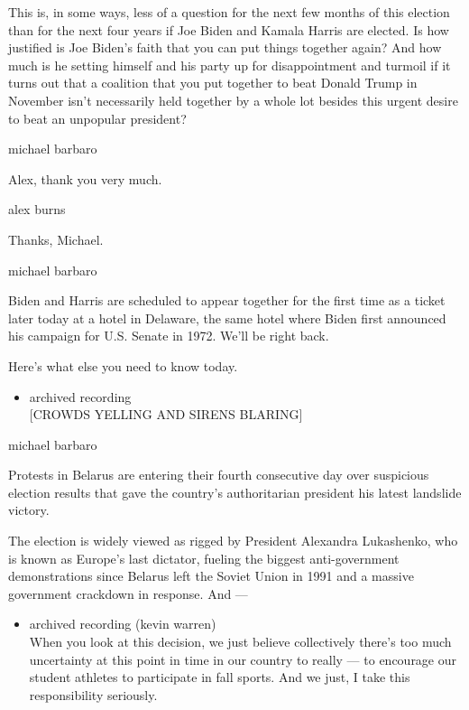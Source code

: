 This is, in some ways, less of a question for the next few months of
this election than for the next four years if Joe Biden and Kamala
Harris are elected. Is how justified is Joe Biden's faith that you can
put things together again? And how much is he setting himself and his
party up for disappointment and turmoil if it turns out that a coalition
that you put together to beat Donald Trump in November isn't necessarily
held together by a whole lot besides this urgent desire to beat an
unpopular president?

michael barbaro

Alex, thank you very much.

alex burns

Thanks, Michael.

michael barbaro

Biden and Harris are scheduled to appear together for the first time as
a ticket later today at a hotel in Delaware, the same hotel where Biden
first announced his campaign for U.S. Senate in 1972. We'll be right
back.

Here's what else you need to know today.

\begin{itemize}
\tightlist
\item
  archived recording\\
  {[}CROWDS YELLING AND SIRENS BLARING{]}
\end{itemize}

michael barbaro

Protests in Belarus are entering their fourth consecutive day over
suspicious election results that gave the country's authoritarian
president his latest landslide victory.

The election is widely viewed as rigged by President Alexandra
Lukashenko, who is known as Europe's last dictator, fueling the biggest
anti-government demonstrations since Belarus left the Soviet Union in
1991 and a massive government crackdown in response. And ---

\begin{itemize}
\tightlist
\item
  archived recording (kevin warren)\\
  When you look at this decision, we just believe collectively there's
  too much uncertainty at this point in time in our country to really
  --- to encourage our student athletes to participate in fall sports.
  And we just, I take this responsibility seriously.
\end{itemize}

